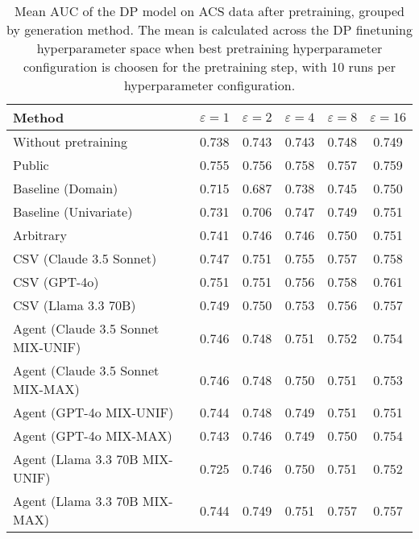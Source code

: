 \begin{table}[h!]
    \centering
    \caption{Mean AUC of the DP model on ACS data after pretraining, grouped by generation method. The mean is calculated across the DP finetuning hyperparameter space when best pretraining hyperparameter configuration is choosen for the pretraining step, with 10 runs per hyperparameter configuration.}
    \label{tab:epsilon_comparison}
    \begin{tabular}{lccccc}
    \toprule
    Method & $\varepsilon=1$ & $\varepsilon=2$ & $\varepsilon=4$ & $\varepsilon=8$ & $\varepsilon=16$ \\
    \midrule
    Without pretraining & 0.738 & 0.743 & 0.743 & 0.748 & 0.749 \\
    \arrayrulecolor{black!50!}\midrule
    Public & \cellcolor{gold!30}0.755 & \cellcolor{gold!30}0.756 & \cellcolor{gold!30}0.758 & \cellcolor{silver!30}0.757 & \cellcolor{silver!30}0.759 \\
    \arrayrulecolor{black!50!}\midrule
    Baseline (Domain) & 0.715 & 0.687 & 0.738 & 0.745 & 0.750 \\
    Baseline (Univariate) & 0.731 & 0.706 & 0.747 & 0.749 & 0.751 \\
    \arrayrulecolor{black!50!}\midrule
    Arbitrary & 0.741 & 0.746 & 0.746 & 0.750 & 0.751 \\
    \arrayrulecolor{black!50!}\midrule
    CSV (Claude 3.5 Sonnet) & 0.747 & \cellcolor{bronze!30}0.751 & \cellcolor{bronze!30}0.755 & \cellcolor{silver!30}0.757 & \cellcolor{bronze!30}0.758 \\
    CSV (GPT-4o) & \cellcolor{bronze!30}0.751 & \cellcolor{bronze!30}0.751 & \cellcolor{silver!30}0.756 & \cellcolor{gold!30}0.758 & \cellcolor{gold!30}0.761 \\
    CSV (Llama 3.3 70B) & 0.749 & 0.750 & 0.753 & \cellcolor{bronze!30}0.756 & 0.757 \\
    \arrayrulecolor{black!50!}\midrule
    Agent (Claude 3.5 Sonnet MIX-UNIF) & 0.746 & 0.748 & 0.751 & 0.752 & 0.754 \\
    Agent (Claude 3.5 Sonnet MIX-MAX) & 0.746 & 0.748 & 0.750 & 0.751 & 0.753 \\
    Agent (GPT-4o MIX-UNIF) & 0.744 & 0.748 & 0.749 & 0.751 & 0.751 \\
    Agent (GPT-4o MIX-MAX) & 0.743 & 0.746 & 0.749 & 0.750 & 0.754 \\
    Agent (Llama 3.3 70B MIX-UNIF) & 0.725 & 0.746 & 0.750 & 0.751 & 0.752 \\
    Agent (Llama 3.3 70B MIX-MAX) & 0.744 & 0.749 & 0.751 & \cellcolor{silver!30}0.757 & 0.757 \\

\end{tabular}
\end{table}
